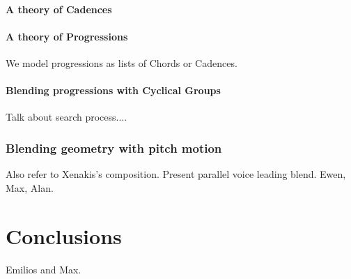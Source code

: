 \documentclass[10pt,twoside,a4paper]{article}
\newcommand\comment[1]{{\color{red}#1}}
\begin{document}
\paragraph{A theory of Cadences}

\paragraph{A theory of Progressions}

We model progressions as lists of Chords or Cadences.


\paragraph{Blending progressions with Cyclical Groups}

Talk about search process....

\subsubsection{Blending geometry with pitch motion}
Also refer to Xenakis's composition. Present parallel voice leading blend. \comment{Ewen, Max, Alan.}


\section{Conclusions}

\comment{Emilios and Max.}
\end{document}
